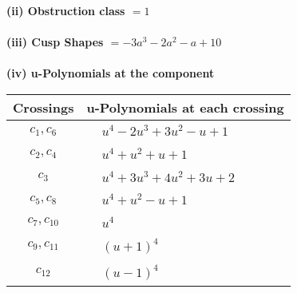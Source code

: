 \documentclass[1p]{elsarticle_modified}
\theoremstyle{definition}
\begin{document}
\flushleft \textbf{(ii) Obstruction class $= 1$}\\~\\
\flushleft \textbf{(iii) Cusp Shapes $= -3 a^3-2 a^2- a+10$}\\~\\
\newpage\renewcommand{\arraystretch}{1}
\flushleft \textbf{(iv) u-Polynomials at the component}\newline \\
\begin{tabular}{m{50pt}|m{274pt}}
Crossings & \hspace{64pt}u-Polynomials at each crossing \\
\hline $$\begin{aligned}c_{1},c_{6}\end{aligned}$$&$\begin{aligned}
&u^4-2 u^3+3 u^2- u+1
\end{aligned}$\\
\hline $$\begin{aligned}c_{2},c_{4}\end{aligned}$$&$\begin{aligned}
&u^4+u^2+u+1
\end{aligned}$\\
\hline $$\begin{aligned}c_{3}\end{aligned}$$&$\begin{aligned}
&u^4+3 u^3+4 u^2+3 u+2
\end{aligned}$\\
\hline $$\begin{aligned}c_{5},c_{8}\end{aligned}$$&$\begin{aligned}
&u^4+u^2- u+1
\end{aligned}$\\
\hline $$\begin{aligned}c_{7},c_{10}\end{aligned}$$&$\begin{aligned}
&u^4
\end{aligned}$\\
\hline $$\begin{aligned}c_{9},c_{11}\end{aligned}$$&$\begin{aligned}
&(u+1)^4
\end{aligned}$\\
\hline $$\begin{aligned}c_{12}\end{aligned}$$&$\begin{aligned}
&(u-1)^4
\end{aligned}$\\
\hline
\end{tabular}\\~\\
\end{document}
